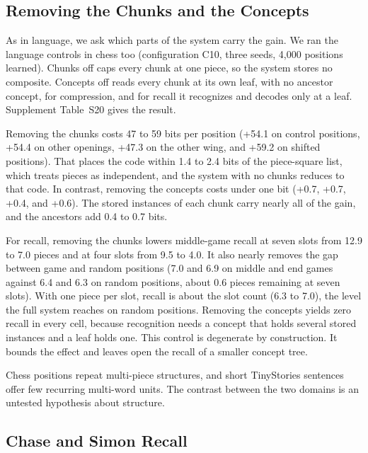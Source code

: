 \documentclass[11pt,letterpaper]{article}
\begin{document}
\subsection{Removing the Chunks and the Concepts}

As in language, we ask which parts of the system carry the gain. We ran the language controls in chess too (configuration C10, three seeds, 4,000 positions learned).
Chunks off caps every chunk at one piece, so the system stores no composite. Concepts off reads every chunk at its own leaf, with no ancestor concept, for compression, and for recall it recognizes and decodes only at a leaf.
Supplement Table~S20 gives the result.

Removing the chunks costs 47 to 59 bits per position (+54.1 on control positions, +54.4 on other openings, +47.3 on the other wing, and +59.2 on shifted positions).
That places the code within 1.4 to 2.4 bits of the piece-square list, which treats pieces as independent, and the system with no chunks reduces to that code.
In contrast, removing the concepts costs under one bit (+0.7, +0.7, +0.4, and +0.6). The stored instances of each chunk carry nearly all of the gain, and the ancestors add 0.4 to 0.7 bits.

For recall, removing the chunks lowers middle-game recall at seven slots from 12.9 to 7.0 pieces and at four slots from 9.5 to 4.0.
It also nearly removes the gap between game and random positions (7.0 and 6.9 on middle and end games against 6.4 and 6.3 on random positions, about 0.6 pieces remaining at seven slots).
With one piece per slot, recall is about the slot count (6.3 to 7.0), the level the full system reaches on random positions.
Removing the concepts yields zero recall in every cell, because recognition needs a concept that holds several stored instances and a leaf holds one.
This control is degenerate by construction. It bounds the effect and leaves open the recall of a smaller concept tree.

Chess positions repeat multi-piece structures, and short TinyStories sentences offer few recurring multi-word units. The contrast between the two domains is an untested hypothesis about structure.

\subsection{Chase and Simon Recall}
\end{document}
